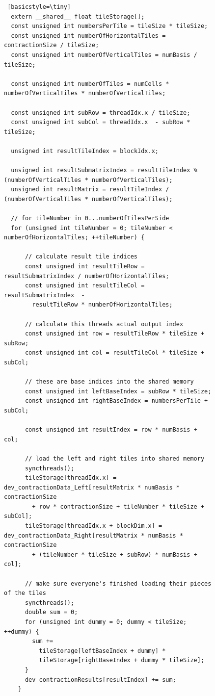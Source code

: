 \begin{figure}[H]
    \begin{lstlisting} [basicstyle=\tiny]
  extern __shared__ float tileStorage[];
  const unsigned int numbersPerTile = tileSize * tileSize;
  const unsigned int numberOfHorizontalTiles = contractionSize / tileSize;
  const unsigned int numberOfVerticalTiles = numBasis / tileSize;

  const unsigned int numberOfTiles = numCells * numberOfVerticalTiles * numberOfVerticalTiles;

  const unsigned int subRow = threadIdx.x / tileSize;
  const unsigned int subCol = threadIdx.x  - subRow * tileSize;

  unsigned int resultTileIndex = blockIdx.x;

  unsigned int resultSubmatrixIndex = resultTileIndex % (numberOfVerticalTiles * numberOfVerticalTiles);
  unsigned int resultMatrix = resultTileIndex / (numberOfVerticalTiles * numberOfVerticalTiles);

  // for tileNumber in 0...numberOfTilesPerSide
  for (unsigned int tileNumber = 0; tileNumber < numberOfHorizontalTiles; ++tileNumber) {
      
      // calculate result tile indices
      const unsigned int resultTileRow = resultSubmatrixIndex / numberOfHorizontalTiles;
      const unsigned int resultTileCol = resultSubmatrixIndex  -
        resultTileRow * numberOfHorizontalTiles;

      // calculate this threads actual output index
      const unsigned int row = resultTileRow * tileSize + subRow;
      const unsigned int col = resultTileCol * tileSize + subCol;

      // these are base indices into the shared memory
      const unsigned int leftBaseIndex = subRow * tileSize;
      const unsigned int rightBaseIndex = numbersPerTile + subCol;

      const unsigned int resultIndex = row * numBasis + col;

      // load the left and right tiles into shared memory
      syncthreads();
      tileStorage[threadIdx.x] = dev_contractionData_Left[resultMatrix * numBasis * contractionSize
        + row * contractionSize + tileNumber * tileSize + subCol];
      tileStorage[threadIdx.x + blockDim.x] = dev_contractionData_Right[resultMatrix * numBasis * contractionSize
        + (tileNumber * tileSize + subRow) * numBasis + col];
      
      // make sure everyone's finished loading their pieces of the tiles
      syncthreads();
      double sum = 0;
      for (unsigned int dummy = 0; dummy < tileSize; ++dummy) {
        sum +=
          tileStorage[leftBaseIndex + dummy] *
          tileStorage[rightBaseIndex + dummy * tileSize];
      }
      dev_contractionResults[resultIndex] += sum;
    }

 \end{lstlisting}
\end{figure}


